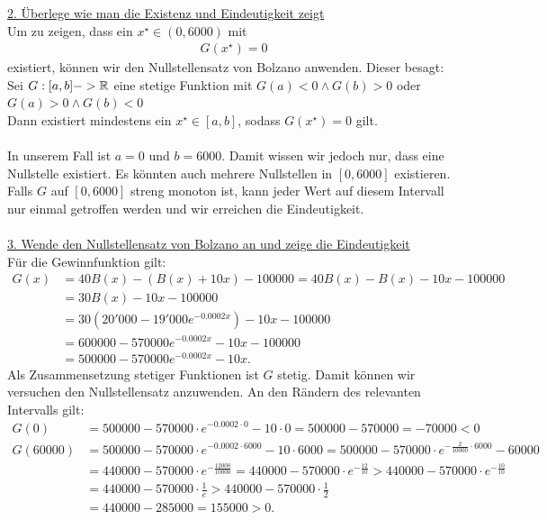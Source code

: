 \underline{2. Überlege wie man die Existenz und Eindeutigkeit zeigt}\\
Um zu zeigen, dass ein $x^\star  \in (0,6000)$ mit
\begin{align*}
	G(x^\star)= 0
\end{align*}
existiert, können wir den Nullstellensatz von Bolzano anwenden. Dieser besagt:\\
Sei $G:[a,b] -> \mathbb{R}$ eine stetige Funktion mit $G(a) < 0 \wedge G(b) > 0 $ oder $G(a) > 0 \wedge G(b) < 0$\\
Dann existiert mindestens ein $x^\star \in [a,b]$, sodass $G(x^\star) = 0$ gilt.\\
\\
In unserem Fall ist $a = 0 $ und $b = 6000$.
Damit wissen wir jedoch nur, dass eine Nullstelle existiert. Es könnten auch mehrere Nullstellen in $[0,6000]$ existieren. 
Falls $G $ auf $[0,6000]$ streng monoton ist, kann jeder Wert auf diesem Intervall nur einmal getroffen werden und wir erreichen die Eindeutigkeit.\\
\\
\underline{3. Wende den Nullstellensatz von Bolzano an und zeige die Eindeutigkeit}\\
Für die Gewinnfunktion gilt:
\begin{align*}
	G(x)
	&= 
	40 B(x) 
	- ( B(x) + 10 x) - 100000
	= 
	40 B(x) 
	-  B(x) -10 x - 100000\\
	&=
	30 B(x) - 10 x - 100000\\
	&=
	30 
	\left(
	20'000 - 19'000 e^{-0.0002 x }
	\right)
	- 10x - 100000\\
	&=
	600000 - 570000 e^{-0.0002 x } - 10 x - 100000\\
	&= 
	500000 - 570000 e^{-0.0002 x } - 10 x.
\end{align*}
Als Zusammensetzung stetiger Funktionen ist $G$ stetig. Damit können wir versuchen den Nullstellensatz anzuwenden. An den Rändern des relevanten Intervalls gilt:
\begin{align*}
	G(0) 
	&= 500000 - 570000 \cdot e^{-0.0002 \cdot 0 } - 10 \cdot  0
	= 500000 - 570000  = - 70000 < 0 \\
	G(60000)
	&=
	500000 - 570000 \cdot e^{-0.0002 \cdot 6000 } - 10 \cdot 6000
	=
	500000 - 570000 \cdot e^{-\frac{2}{10000} \cdot 6000 } - 60000\\
	&=
	440000 - 570000 \cdot e^{-\frac{12000}{10000}  } 
	=
	440000 - 570000 \cdot e^{-\frac{12}{10}  } 
	>
	440000 - 570000 \cdot e^{-\frac{10}{10}  } \\
	&=
	440000 - 570000 \cdot \frac{1}{e}
	>
	440000 - 570000 \cdot \frac{1}{2}\\
	&= 440000 - 285000 = 155000 > 0.
\end{align*}
